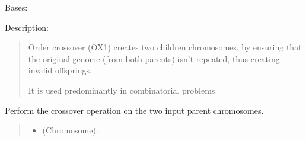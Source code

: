 \documentclass[letterpaper,10pt,english]{sphinxmanual}
\begin{document}
\begin{fulllineitems}
\label{\detokenize{pygenalgo.operators.crossover:pygenalgo.operators.crossover.order_crossover.OrderCrossover}}
\pysigstartsignatures
\pysiglinewithargsret
{}
{}
{}
\pysigstopsignatures
\sphinxAtStartPar
Bases: {\hyperref[\detokenize{pygenalgo.operators.crossover:pygenalgo.operators.crossover.crossover_operator.CrossoverOperator}]{}}

\sphinxAtStartPar
Description:
\begin{quote}

\sphinxAtStartPar
Order crossover (OX1) creates two children chromosomes, by ensuring that the original
genome (from both parents) isn’t repeated, thus creating invalid offsprings.

\sphinxAtStartPar
It is used predominantly in combinatorial problems.
\end{quote}

\begin{fulllineitems}
\label{\detokenize{pygenalgo.operators.crossover:pygenalgo.operators.crossover.order_crossover.OrderCrossover.crossover}}
\pysigstartsignatures
\pysiglinewithargsret
{}
{\sphinxparamcomma {}}
{}
\pysigstopsignatures
\sphinxAtStartPar
Perform the crossover operation on the two input parent chromosomes.
\begin{quote}\begin{description}
\begin{itemize}
\item {} 
\sphinxAtStartPar
{} \textendash{} (Chromosome).


\end{itemize}
\end{description}
\end{quote}
\end{fulllineitems}
\end{fulllineitems}
\end{document}
